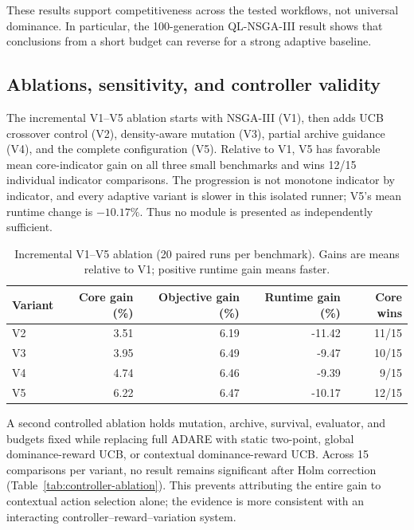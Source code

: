 \documentclass[preprint,12pt]{elsarticle}
\begin{document}
\begin{table}[t]
\caption{Core-indicator results by adaptive baseline and long-budget protocol.}
\label{tab:long-budget}
\centering\small
\resizebox{\textwidth}{!}{}
\end{table}

These results support competitiveness across the tested workflows, not universal dominance. In particular, the 100-generation QL-NSGA-III result shows that conclusions from a short budget can reverse for a strong adaptive baseline.

\subsection{Ablations, sensitivity, and controller validity}
The incremental V1--V5 ablation starts with NSGA-III (V1), then adds UCB crossover control (V2), density-aware mutation (V3), partial archive guidance (V4), and the complete configuration (V5). Relative to V1, V5 has favorable mean core-indicator gain on all three small benchmarks and wins 12/15 individual indicator comparisons. The progression is not monotone indicator by indicator, and every adaptive variant is slower in this isolated runner; V5's mean runtime change is $-10.17\%$. Thus no module is presented as independently sufficient.

\begin{table}[t]
\caption{Incremental V1--V5 ablation (20 paired runs per benchmark). Gains are means relative to V1; positive runtime gain means faster.}
\label{tab:ablation}
\centering\small
\begin{tabular}{lrrrr}
\toprule
Variant & Core gain (\%) & Objective gain (\%) & Runtime gain (\%) & Core wins \\
\midrule
V2 & 3.51 & 6.19 & -11.42 & 11/15 \\
V3 & 3.95 & 6.49 & -9.47 & 10/15 \\
V4 & 4.74 & 6.46 & -9.39 & 9/15 \\
V5 & 6.22 & 6.47 & -10.17 & 12/15 \\
\bottomrule
\end{tabular}
\end{table}

A second controlled ablation holds mutation, archive, survival, evaluator, and budgets fixed while replacing full ADARE with static two-point, global dominance-reward UCB, or contextual dominance-reward UCB. Across 15 comparisons per variant, no result remains significant after Holm correction (Table~\ref{tab:controller-ablation}). This prevents attributing the entire gain to contextual action selection alone; the evidence is more consistent with an interacting controller--reward--variation system.
\end{document}
